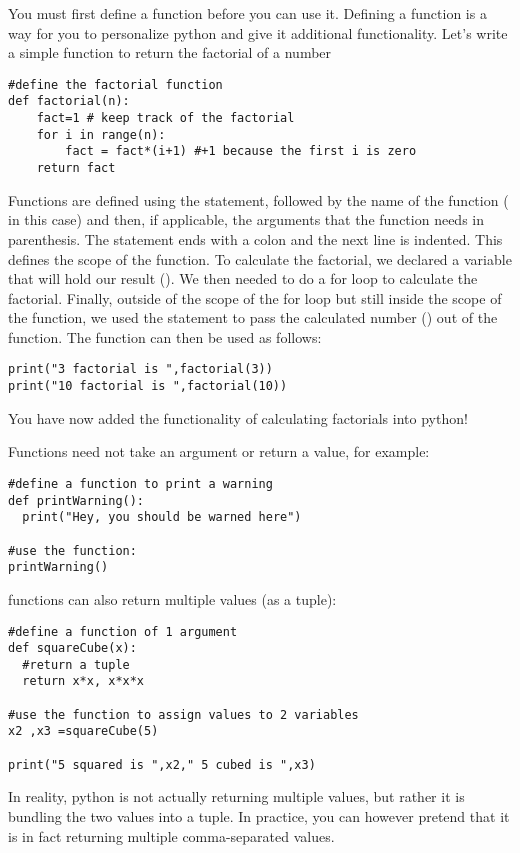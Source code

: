 You must first define a function before you can use it. Defining a function is a way for you to personalize python and give it additional functionality. Let's write a simple function to return the factorial of a number
\begin{lstlisting}[frame=single] 
#define the factorial function
def factorial(n):
    fact=1 # keep track of the factorial
    for i in range(n):
        fact = fact*(i+1) #+1 because the first i is zero
    return fact
\end{lstlisting}
Functions are defined using the  statement, followed by the name of the function ( in this case) and then, if applicable, the arguments that the function needs in parenthesis. The statement ends with a colon and the next line is indented. This defines the scope of the function. To calculate the factorial, we declared a variable that will hold our result (). We then needed to do a for loop to calculate the factorial. Finally, outside of the scope of the for loop but still inside the scope of the function, we used the  statement to pass the calculated number () out of the function. The function can then be used as follows:
\begin{lstlisting}[frame=single] 
print("3 factorial is ",factorial(3))
print("10 factorial is ",factorial(10))
\end{lstlisting}
You have now added the functionality of calculating factorials into python!

Functions need not take an argument or return a value, for example:
\begin{lstlisting}[frame=single] 
#define a function to print a warning
def printWarning():
  print("Hey, you should be warned here")

#use the function:
printWarning()
\end{lstlisting}

functions can also return multiple values (as a tuple):
\begin{lstlisting}[frame=single] 
#define a function of 1 argument
def squareCube(x):
  #return a tuple
  return x*x, x*x*x

#use the function to assign values to 2 variables
x2 ,x3 =squareCube(5)

print("5 squared is ",x2," 5 cubed is ",x3)
\end{lstlisting}
In reality, python is not actually returning multiple values, but rather it is bundling the two values into a tuple. In practice, you can however pretend that it is in fact returning multiple comma-separated values.



